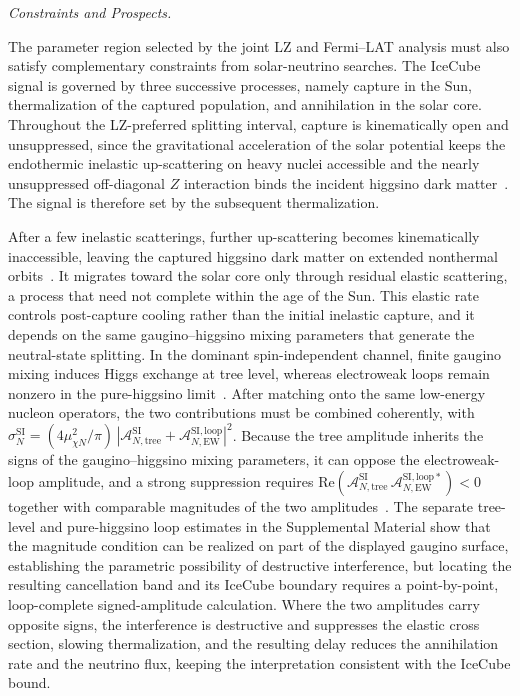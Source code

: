 \documentclass[%
  aps,
  prl,
  reprint,
  superscriptaddress,
  amsmath,
  amssymb,
  longbibliography
]{revtex4-2}
\begin{document}
{\it Constraints and Prospects.}  


The parameter region selected by the joint LZ and Fermi--LAT analysis must also satisfy complementary constraints from solar-neutrino searches. The IceCube signal is governed by three successive processes, namely capture in the Sun, thermalization of the captured population, and annihilation in the solar core. Throughout the LZ-preferred splitting interval, capture is kinematically open and unsuppressed, since the gravitational acceleration of the solar potential keeps the endothermic inelastic up-scattering on heavy nuclei accessible and the nearly unsuppressed off-diagonal \(Z\) interaction binds the incident higgsino dark matter~\cite{Nussinov:2009ft,Catena:2018vzc}. The signal is therefore set by the subsequent thermalization.

After a few inelastic scatterings, further up-scattering becomes kinematically inaccessible, leaving the captured higgsino dark matter on extended nonthermal orbits~\cite{Blennow:2018xwu}. It migrates toward the solar core only through residual elastic scattering, a process that need not complete within the age of the Sun. This elastic rate controls post-capture cooling rather than the initial inelastic capture, and it depends on the same gaugino--higgsino mixing parameters that generate the neutral-state splitting. In the dominant spin-independent channel, finite gaugino mixing induces Higgs exchange at tree level, whereas electroweak loops remain nonzero in the pure-higgsino limit~\cite{Hisano:2004pv,Chen:2019gtm}. After matching onto the same low-energy nucleon operators, the two contributions must be combined coherently, with $\sigma_N^{\mathrm{SI}}=(4\mu_{\chi N}^2/\pi)\,\left|\mathcal{A}_{N,\mathrm{tree}}^{\mathrm{SI}}+\mathcal{A}_{N,\mathrm{EW}}^{\mathrm{SI,loop}}\right|^2$. Because the tree amplitude inherits the signs of the gaugino--higgsino mixing parameters, it can oppose the electroweak-loop amplitude, and a strong suppression requires $\mathrm{Re}\!\left(\mathcal{A}_{N,\mathrm{tree}}^{\mathrm{SI}}\,\mathcal{A}_{N,\mathrm{EW}}^{\mathrm{SI,loop*}}\right)<0$ together with comparable magnitudes of the two amplitudes~\cite{Han:2018gej,Bisal:2023fgb}. The separate tree-level and pure-higgsino loop estimates in the Supplemental Material show that the magnitude condition can be realized on part of the displayed gaugino surface, establishing the parametric possibility of destructive interference, but locating the resulting cancellation band and its IceCube boundary requires a point-by-point, loop-complete signed-amplitude calculation. Where the two amplitudes carry opposite signs, the interference is destructive and suppresses the elastic cross section, slowing thermalization, and the resulting delay reduces the annihilation rate and the neutrino flux, keeping the interpretation consistent with the IceCube bound. 
\end{document}
